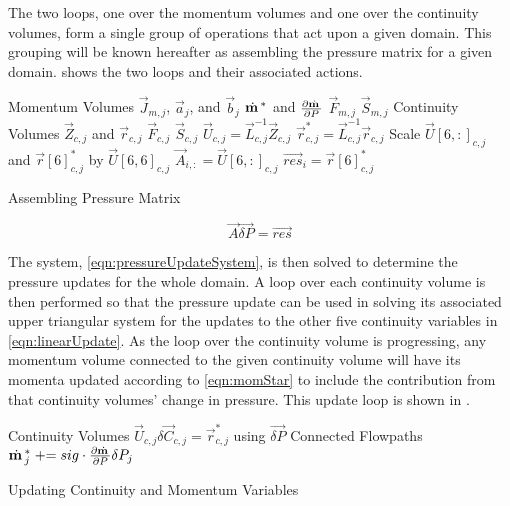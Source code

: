 The two loops, one over the momentum volumes and one over the continuity volumes, form a single group of operations that act upon a given domain.
This grouping will be known hereafter as assembling the pressure matrix for a given domain.
 shows the two loops and their associated actions.

\begin{algo}[ht!]
\setlength{\baselineskip}{0.625\baselineskip}
\begin{algorithmic}[1]
\Loop \; Momentum Volumes
	\Calculate $\vec{J}_{m, j}$, $\vec{a}_{j}$, and $\vec{b}_{j}$
	\Calculate $\momVec{}^{*}$ and $\frac{\partial \momVec{}}{\partial P}$
	\Calculate $\vec{F}_{m, j}$	
	\Calculate $\vec{S}_{m, j}$	
\EndLoop
\Loop \; Continuity Volumes
   	\Calculate $\vec{Z}_{c,j}$ and $\vec{r}_{c, j}$
 	\Calculate $\vec{F}_{c, j}$	
	\Calculate $\vec{S}_{c, j}$	
   	\Calculate $\vec{U}_{c, j} = \vec{L}_{c, j}^{-1} \vec{Z}_{c, j}$
   	\Calculate $\vec{r}^{*}_{c, j} = \vec{L}_{c, j}^{-1} \vec{r}_{c, j}$
   	\Set Scale $\vec{U}[6, :]_{c, j}$ and $\vec{r}[6]^{*}_{c, j}$ by $\vec{U}[6,6]_{c, j}$
   	\Set $\vec{A}_{i, :} = \vec{U}[6,:]_{c, j}$
   	\Set $\vec{res}_{i} = \vec{r}[6]^{*}_{c, j}$
\EndLoop
\end{algorithmic}
\caption{Assembling Pressure Matrix}
\label{alg:xschem}
\end{algo}

\begin{equation}
\label{eqn:pressureUpdateSystem}
\vec{A} \vec{\delta P} = \vec{res}
\end{equation}

The system, \eqref{eqn:pressureUpdateSystem}, is then solved to determine the pressure updates for the whole domain.
A loop over each continuity volume is then performed so that the pressure update can be used in solving its associated upper triangular system for the updates to the other five continuity variables in \eqref{eqn:linearUpdate}.
As the loop over the continuity volume is progressing, any momentum volume connected to the given continuity volume will have its momenta updated according to \eqref{eqn:momStar} to include the contribution from that continuity volumes' change in pressure. 
This update loop is shown in .

\begin{algo}[ht!]
\setlength{\baselineskip}{0.625\baselineskip}
\begin{algorithmic}[1]
\Loop \; Continuity Volumes
	\Solve $\vec{U}_{c, j} \delta \vec{C}_{c, j} = \vec{r}^{*}_{c, j}$ using $\vec{\delta P}$		
	\Loop \; Connected Flowpaths
		\Set $\momVec{}^{*}_{j} \pluseq sig \cdot \frac{\partial \momVec{}}{\partial P} \delta P_{j}$
	\EndLoop
\EndLoop
\end{algorithmic}
\caption{Updating Continuity and Momentum Variables}
\label{alg:updateVariables}
\end{algo}

